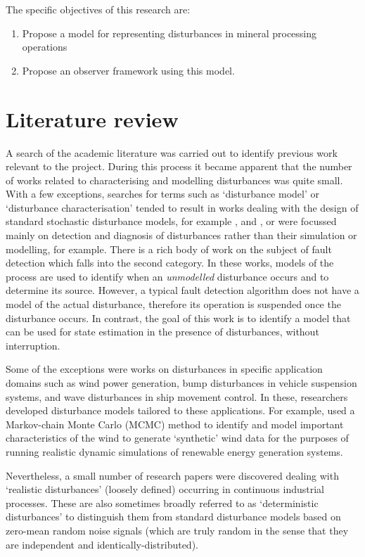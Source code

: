 The specific objectives of this research are:

\begin{enumerate}
	\item Propose a model for representing disturbances in mineral processing operations
	\item Propose an observer framework using this model.
\end{enumerate}

\section*{Literature review}

A search of the academic literature was carried out to identify previous work relevant to the project. During this process it became apparent that the number of works related to characterising and modelling disturbances was quite small. With a few exceptions, searches for terms such as `disturbance model' or `disturbance characterisation' tended to result in works dealing with the design of standard stochastic disturbance models, for example \cite{muske_disturbance_2002}, and \cite{pannocchia_robust_2003}, or were focussed mainly on detection and diagnosis of disturbances rather than their simulation or modelling, \cite{thornhill_advances_2007} for example. There is a rich body of work on the subject of fault detection which falls into the second category. In these works, models of the process are used to identify when an \textit{unmodelled} disturbance occurs and to determine its source. However, a typical fault detection algorithm does not have a model of the actual disturbance, therefore its operation is suspended once the disturbance occurs. In contrast, the goal of this work is to identify a model that can be used for state estimation in the presence of disturbances, without interruption.

Some of the exceptions were works on disturbances in specific application domains such as wind power generation, bump disturbances in vehicle suspension systems, and wave disturbances in ship movement control.  In these, researchers developed disturbance models tailored to these applications. For example, \cite{papaefthymiou_mcmc_2008} used a Markov-chain Monte Carlo (MCMC) method to identify and model important characteristics of the wind to generate `synthetic' wind data for the purposes of running realistic dynamic simulations of renewable energy generation systems.

Nevertheless, a small number of research papers were discovered dealing with `realistic disturbances' (loosely defined) occurring in continuous industrial processes. These are also sometimes broadly referred to as `deterministic disturbances' to distinguish them from standard disturbance models based on zero-mean random noise signals (which are truly random in the sense that they are independent and identically-distributed).

